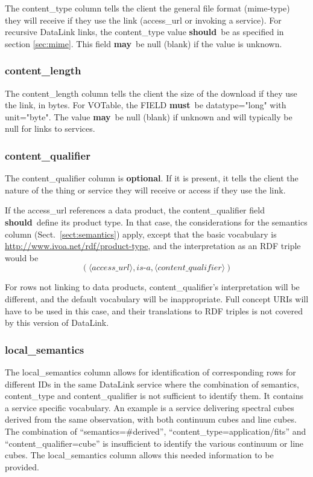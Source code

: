 \documentclass[11pt,a4paper]{ivoa}
\newcommand{\attval}[2]{#1={\allowbreak}{"}#2{"}}
\newcommand{\rfcmust}{\textbf{must}}
\newcommand{\rfcshould}{\textbf{should}}
\newcommand{\rfcmay}{\textbf{may}}
\newcommand{\rfcoptional}{\textbf{optional}}
\begin{document}
The content\_type column tells the client the general file format
(mime-type) they will receive if they use the link
(access\_url or invoking a service).
For recursive DataLink links, the content\_type value \rfcshould\
be as specified in section \ref{sec:mime}.
This field \rfcmay\ be null (blank) if the value is unknown.

\subsubsection{content\_length}

The content\_length column tells the client the size of the download
if they use the link, in bytes. For VOTable, the FIELD \rfcmust\ be
\attval{datatype}{long} with \attval{unit}{byte}.
The value \rfcmay\ be null (blank)
if unknown and will typically be null for links to services.

\subsubsection{content\_qualifier}
\label{sec:contentQualifier}

The content\_qualifier column is \rfcoptional. If it is present, it tells
the client the nature of the thing or service they will receive or access
if they use the link.

If the access\_url references a data product, the content\_qualifier
field \rfcshould\ define its product type.  In that case, the considerations
for the semantics column (Sect.~\ref{sect:semantics}) apply, except that
the basic vocabulary is \url{http://www.ivoa.net/rdf/product-type}, and
the interpretation as an RDF triple would be $$(
\langle\textit{access\_url}\rangle, \textit{is-a},
\langle\textit{content\_qualifier}\rangle)$$

For rows not linking to data products, content\_qualifier's
interpretation will be different, and the default vocabulary will be
inappropriate.  Full concept URIs will have to be used in this case, and
their translations to RDF triples is not covered by this version of
DataLink.

\subsubsection{local\_semantics}
\label{sec:localSemantics}

The local\_semantics column allows for identification of corresponding rows for
different IDs in the same DataLink service where the combination of semantics,
content\_type and content\_qualifier is not sufficient to identify them.
It contains a service specific vocabulary. An example is a service delivering
spectral cubes derived from the same observation, with both continuum cubes
and line cubes. The combination of ``semantics=\#derived'',
``content\_type=application/fits'' and ``content\_qualifier=cube''
is insufficient to identify the various continuum or line cubes.
The local\_semantics column allows this needed information to be provided.
\end{document}

